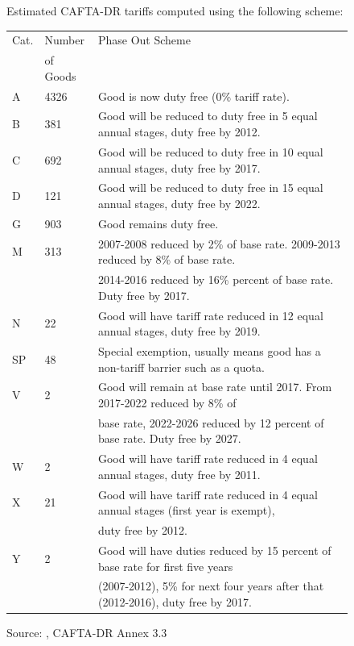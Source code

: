 \documentclass[12pt]{article}
\begin{document}
\begin{figure}[H]
\begin{center}
Estimated CAFTA-DR tariffs computed using the following scheme:
\begin{tabular}{lll}
\hline Cat. & Number & Phase Out Scheme \\
& of Goods & \\
\hline
A &4326&Good is now duty free (0\% tariff rate).\\
B & 381&Good will be reduced to duty free in 5 equal annual stages, duty free by 2012.\\
C & 692&Good will be reduced to duty free in 10 equal annual stages, duty free by 2017.\\
D & 121&Good will be reduced to duty free in 15 equal annual stages, duty free by 2022.\\
G & 903&Good remains duty free.\\
M & 313& 2007-2008 reduced by 2\% of base rate. 2009-2013 reduced by 8\% of base rate. \\
& & 2014-2016 reduced by 16\% percent of base rate. Duty free by 2017.\\
N & 22 & Good will have tariff rate reduced in 12 equal annual stages, duty free by 2019.\\
SP& 48 & Special exemption, usually means good has a non-tariff barrier such as a quota.\\
V &  2 & Good will remain at base rate until 2017. From 2017-2022 reduced by 8\% of\\
& & base rate, 2022-2026 reduced by 12 percent of base rate. Duty free by 2027.\\
W &  2 & Good will have tariff rate reduced in 4 equal annual stages, duty free by 2011.\\
X & 21 & Good will have tariff rate reduced in 4 equal annual stages (first year is exempt),\\ 
& & duty free by 2012. \\
Y & 2  & Good will have duties reduced by 15 percent of base rate for first five years\\
& & (2007-2012), 5\% for next four years after that (2012-2016), duty free by 2017.\\
\end{tabular}
\caption{\label{fig:Appendix1}}
Source: \citet{ustraderep}, CAFTA-DR Annex 3.3
\end{center}
\end{figure}
\end{document}
